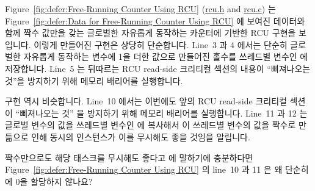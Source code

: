 Figure~\ref{fig:defer:Free-Running Counter Using RCU}
(\url{rcu.h} and \url{rcu.c})
는 Figure~\ref{fig:defer:Data for Free-Running Counter Using RCU} 에 보여진
데이터와 함께 짝수 값만을 갖는 글로벌한 자유롭게 동작하는 카운터에 기반한 RCU
구현을 보입니다.
이렇게 만들어진  구현은 상당히 단순합니다.
Line~3 과 4 에서는 단순히 글로벌한 자유롭게 동작하는  변수에 1을
더한 값으로 만들어진 홀수를 쓰레드별 변수인  에 저장합니다.
Line~5 는 뒤따르는 RCU read-side 크리티컬 섹션의 내용이 ``삐져나오는 것''을
방지하기 위해 메모리 배리어를 실행합니다.
\iffalse

Figure~\ref{fig:defer:Free-Running Counter Using RCU}
(\url{rcu.h} and \url{rcu.c})
show an RCU implementation based on a single global free-running counter
that takes on only even-numbered values, with data shown in
Figure~\ref{fig:defer:Data for Free-Running Counter Using RCU}.
The resulting \co{rcu_read_lock()} implementation is extremely
straightforward.
Lines~3 and~4 simply add one to the global free-running \co{rcu_gp_ctr}
variable and stores the resulting odd-numbered value into the
\co{rcu_reader_gp} per-thread variable.
Line~5 executes a memory barrier to prevent the content of the
subsequent RCU read-side critical section from ``leaking out''.
\fi

 구현 역시 비슷합니다.
Line~10 에서는 이번에도 앞의 RCU read-side 크리티컬 섹션이 ``삐져나오는 것'' 을
방지하기 위해 메모리 배리어를 실행합니다.
Line~11 과 12 는  글로벌 변수의 값을 쓰레드별 변수인
 에 복사해서 이 쓰레드별 변수의 값을 짝수로 만듦으로 인해
동시의  인스턴스가 이를 무시해도 좋을 것임을 알립니다.
\iffalse

The \co{rcu_read_unlock()} implementation is similar.
Line~10 executes a memory barrier, again to prevent the prior RCU
read-side critical section from ``leaking out''.
Lines~11 and~12 then copy the \co{rcu_gp_ctr} global variable to the
\co{rcu_reader_gp} per-thread variable, leaving this per-thread
variable with an even-numbered value so that a concurrent instance
of \co{synchronize_rcu()} will know to ignore it.
\fi

\QuickQuiz{}
	짝수만으로도 해당 태스크를 무시해도 좋다고  에
	말하기에 충분하다면
	Figure~\ref{fig:defer:Free-Running Counter Using RCU} 의 line~10 과 11
	은 왜 단순히  에 0을 할당하지 않나요?
	\iffalse

